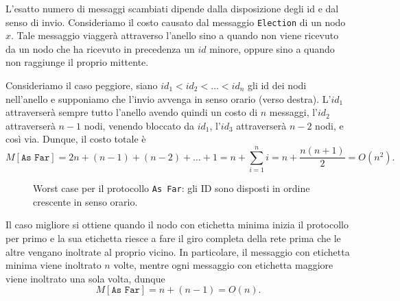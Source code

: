 L'esatto numero di messaggi scambiati dipende dalla disposizione degli id e dal senso di invio. Consideriamo il costo causato dal messaggio \texttt{Election} di un nodo $x$. Tale messaggio viaggerà attraverso l'anello sino a quando non viene ricevuto da un nodo che ha ricevuto in precedenza un $id$ minore, oppure sino a quando non raggiunge il proprio mittente.

Consideriamo il caso peggiore, siano $id_1 < id_2 < \ldots < id_n$ gli id dei nodi nell'anello e supponiamo che l'invio avvenga in senso orario (verso destra). L'$id_1$ attraverserà sempre tutto l'anello avendo quindi un costo di $n$ messaggi, l'$id_2$ attraverserà $n-1$ nodi, venendo bloccato da $id_1$, l'$id_3$ attraverserà $n-2$ nodi, e così via. Dunque, il costo totale è
\[
    M[\texttt{As Far}] = 2n + (n-1) + (n-2) + \ldots + 1 = n + \sum_{i=1}^{n} i = n + \frac{n(n+1)}{2} = O(n^2).
\]

\begin{figure}[htbp]
    \centering
    
    \caption{Worst case per il protocollo \texttt{As Far}: gli ID sono disposti in ordine crescente in senso orario.}
    \label{fig:worst_case_as_far}
\end{figure}

Il caso migliore si ottiene quando il nodo con etichetta minima inizia il protocollo per primo e la sua etichetta riesce a fare il giro completa della rete prima che le altre vengano inoltrate al proprio vicino. In particolare, il messaggio con etichetta minima viene inoltrato $n$ volte, mentre ogni messaggio con etichetta maggiore viene inoltrato una sola volta, dunque
\[
    M[\texttt{As Far}] = n + (n-1) = O(n).
\]

\newpage

